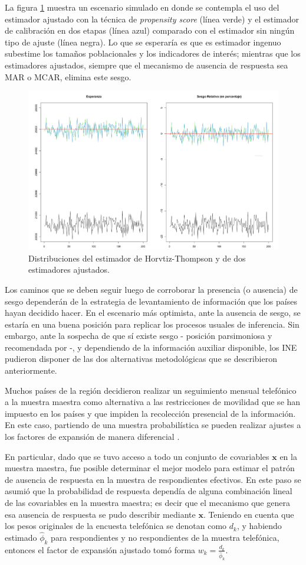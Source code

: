 \documentclass[
  12pt,
]{book}
\begin{document}
La figura \ref{fig:fight4dist} muestra un escenario simulado en donde se contempla el uso del estimador ajustado con la técnica de \emph{propensity score} (línea verde) y el estimador de calibración en dos etapas (línea azul) comparado con el estimador sin ningún tipo de ajuste (línea negra). Lo que se esperaría es que es estimador ingenuo subestime los tamaños poblacionales y los indicadores de interés; mientras que los estimadores ajustados, siempre que el mecanismo de ausencia de respuesta sea MAR o MCAR, elimina este sesgo.

\begin{figure}

{\centering \includegraphics[width=0.5\linewidth]{Pics/calnr2} 

}

\caption{Distribuciones del estimador de Horvtiz-Thompson y de dos estimadores ajustados.}\label{fig:fight4dist}
\end{figure}

Los caminos que se deben seguir luego de corroborar la presencia (o ausencia) de sesgo dependerán de la estrategia de levantamiento de información que los países hayan decidido hacer. En el escenario más optimista, ante la ausencia de sesgo, se estaría en una buena posición para replicar los procesos usuales de inferencia. Sin embargo, ante la sospecha de que sí existe sesgo - posición parsimoniosa y recomendada por \citet{CEPAL_sesgos2020} -, y dependiendo de la información auxiliar disponible, los INE pudieron disponer de las dos alternativas metodológicas que se describieron anteriormente.

Muchos países de la región decidieron realizar un seguimiento mensual telefónico a la muestra maestra como alternativa a las restricciones de movilidad que se han impuesto en los países y que impiden la recolección presencial de la información. En este caso, partiendo de una muestra probabilística se pueden realizar ajustes a los factores de expansión de manera diferencial \citep{CEPAL_continua}.

En particular, dado que se tuvo acceso a todo un conjunto de covariables \(\mathbf{x}\) en la muestra maestra, fue posible determinar el mejor modelo para estimar el patrón de ausencia de respuesta en la muestra de respondientes efectivos. En este paso se asumió que la probabilidad de respuesta dependía de alguna combinación lineal de las covariables en la muestra maestra; es decir que el mecanismo que genera esa ausencia de respuesta se pudo describir mediante \(\mathbf{x}\). Teniendo en cuenta que los pesos originales de la encuesta telefónica se denotan como \(d_k\), y habiendo estimado \(\hat\phi_{k}\) para respondientes y no respondientes de la muestra telefónica, entonces el factor de expansión ajustado tomó forma \(w_k = \frac{d_k}{\hat{\phi}_k}\).
\end{document}
